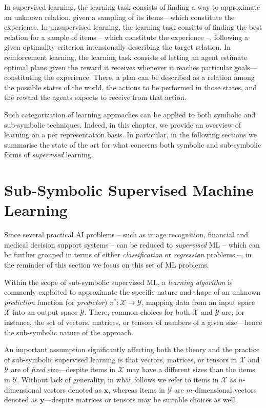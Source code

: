 \documentclass[12pt,a4paper,openright,twoside]{book}
\begin{document}
In supervised learning, the learning task consists of finding a way to approximate an unknown relation, given a sampling of its items---which constitute the experience.
%
In unsupervised learning, the learning task consists of finding the best relation for a sample of items -- which constitute the experience --, following a given optimality criterion intensionally describing the target relation.
%
In reinforcement learning, the learning task consists of letting an agent estimate optimal plans given the reward it receives whenever it reaches particular goals---constituting the experience.
%
There, a plan can be described as a relation among the possible states of the world, the actions to be performed in those states, and the reward the agents expects to receive from that action.

Such categorization of learning approaches can be applied to both symbolic and sub-symbolic techniques.
%
Indeed, in this chapter, we provide an overview of learning on a per representation basis.
%
In particular, in the following sections we summarise the state of the art for what concerns both symbolic and sub-symbolic forms of \emph{supervised} learning.

\section{Sub-Symbolic Supervised Machine Learning}

Since several practical AI problems -- such as image recognition, financial and medical decision support systems -- can be reduced to \emph{supervised} ML -- which can be further grouped in terms of either  \emph{classification} or \emph{regression} problems \cite{twala2010,smlreview-faia160} --, in the reminder of this section we focus on this set of ML problems.

Within the scope of sub-symbolic supervised ML, a \emph{learning algorithm} is commonly exploited to approximate the specific nature and shape of an unknown \emph{prediction} function (or \emph{predictor}) $\pi^*: \mathcal{X} \rightarrow \mathcal{Y}$, mapping data from an input space $\mathcal{X}$ into an output space $\mathcal{Y}$.
%
There, common choices for both $\mathcal{X}$ and $\mathcal{Y}$ are, for instance, the set of vectors, matrices, or tensors of numbers of a given size---hence the sub-symbolic nature of the approach.

An important assumption significantly affecting both the theory and the practice of sub-symbolic supervised learning is that vectors, matrices, or tensors in $\mathcal{X}$ and $\mathcal{Y}$ are of \emph{fixed} size---despite items in $\mathcal{X}$ may have a different sizes than the items in $\mathcal{Y}$.
%
Without lack of generality, in what follows we refer to items in $\mathcal{X}$ as $n$-dimensional vectors denoted as $\mathbf{x}$, whereas items in $\mathcal{Y}$ are $m$-dimensional vectors denoted as $\mathbf{y}$---despite matrices or tensors may be suitable choices as well.
\end{document}
